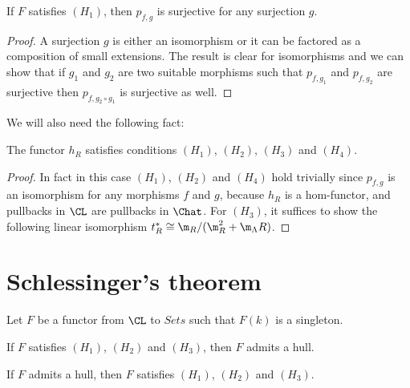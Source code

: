 \begin{lemma}
  \label{lem:h1+}
  \leanok
  If $F$ satisfies $(H_1)$, then $p_{f, g}$ is surjective
  for any surjection $g$.
\end{lemma}

\begin{proof}
  \leanok
  A surjection $g$ is either an isomorphism or it can be factored
  as a composition of small extensions.
  The result is clear for isomorphisms and we can show that
  if $g_1$ and $g_2$ are two suitable morphisms such that $p_{f, g_1}$
  and $p_{f, g_2}$ are surjective then $p_{f, g_2 \circ g_1}$
  is surjective as well.
\end{proof}

We will also need the following fact:

\begin{lemma}
  \label{lem:hRconds}
  \leanok
  The functor $h_R$ satisfies conditions $(H_1)$, $(H_2)$,
  $(H_3)$ and $(H_4)$.
\end{lemma}

\begin{proof}
  In fact in this case $(H_1)$, $(H_2)$ and $(H_4)$ hold trivially since
  $p_{f, g}$ is an isomorphism for any morphisms $f$
  and $g$, because $h_R$ is a hom-functor, and pullbacks in $\CL$ are
  pullbacks in $\Chat$.
  For $(H_3)$, it suffices to show the following linear isomorphism
  $t_R^* \cong \m_R / (\m_R ^ 2 + \m_\Lambda R)$.
\end{proof}

\chapter{Schlessinger's theorem}
\label{sec:thm}

Let $F$ be a functor from $\CL$ to $Sets$ such that $F(k)$ is a singleton.

\begin{theorem}
  \label{thm:Schlessinger1}
  \leanok
  If $F$ satisfies $(H_1)$, $(H_2)$ and $(H_3)$, then $F$ admits a hull.
\end{theorem}

\begin{theorem}
  \label{thm:Schlessinger2}
  \leanok
  If $F$ admits a hull, then $F$ satisfies $(H_1)$, $(H_2)$ and $(H_3)$.
\end{theorem}

